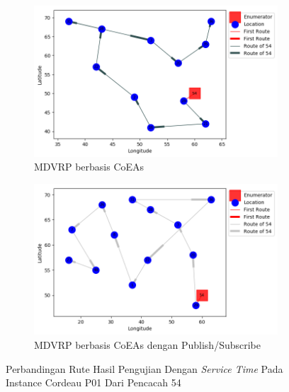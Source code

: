 \begin{figure}[H]
	\centering
	\begin{subfigure}[t]{\textwidth}
		\centering
		\includegraphics[width=\textwidth]{Resources/Images/cordeau_p01_tw/cordeau_p01_tw_54_coes}
		\caption{MDVRP berbasis CoEAs}
		\label{fig:cordeau_p01_tw_54_coes}
	\end{subfigure}
	\begin{subfigure}[t]{\textwidth}
		\centering
		\includegraphics[width=\textwidth]{Resources/Images/cordeau_p01_tw/cordeau_p01_tw_54_pubsub_coes}
		\caption{MDVRP berbasis CoEAs dengan Publish/Subscribe}
		\label{fig:cordeau_p01_tw_54_pubsub_coes}
	\end{subfigure}
	\caption{Perbandingan Rute Hasil Pengujian Dengan \textit{Service Time} Pada Instance Cordeau P01 Dari Pencacah 54}
	\label{fig:cordeau_p01_tw_54}
\end{figure}



